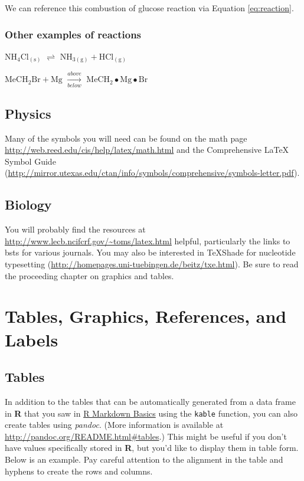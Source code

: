 \documentclass[12pt,twoside]{reedthesis}
\begin{document}
  We can reference this combustion of glucose reaction via Equation
  \ref{eq:reaction}.
  
  \subsection{Other examples of
  reactions}\label{other-examples-of-reactions}
  
  \(\mathrm{NH_4Cl_{(s)}}\) \(\rightleftharpoons\)
  \(\mathrm{NH_{3(g)}+HCl_{(g)}}\)
  
  \noindent \(\mathrm{MeCH_2Br + Mg}\) \(\xrightarrow[below]{above}\)
  \(\mathrm{MeCH_2\bullet Mg \bullet Br}\)
  
  \section{Physics}\label{physics}
  
  Many of the symbols you will need can be found on the math page
  \url{http://web.reed.edu/cis/help/latex/math.html} and the Comprehensive
  LaTeX Symbol Guide
  (\url{http://mirror.utexas.edu/ctan/info/symbols/comprehensive/symbols-letter.pdf}).
  
  \section{Biology}\label{biology}
  
  You will probably find the resources at
  \url{http://www.lecb.ncifcrf.gov/~toms/latex.html} helpful, particularly
  the links to bsts for various journals. You may also be interested in
  TeXShade for nucleotide typesetting
  (\url{http://homepages.uni-tuebingen.de/beitz/txe.html}). Be sure to
  read the proceeding chapter on graphics and tables.
  
  \chapter{Tables, Graphics, References, and Labels}\label{ref-labels}
  
  \section{Tables}\label{tables}
  
  In addition to the tables that can be automatically generated from a
  data frame in \textbf{R} that you saw in
  \protect\hyperlink{rmd-basics}{R Markdown Basics} using the
  \texttt{kable} function, you can also create tables using \emph{pandoc}.
  (More information is available at
  \url{http://pandoc.org/README.html\#tables}.) This might be useful if
  you don't have values specifically stored in \textbf{R}, but you'd like
  to display them in table form. Below is an example. Pay careful
  attention to the alignment in the table and hyphens to create the rows
  and columns.
  
\end{document}
